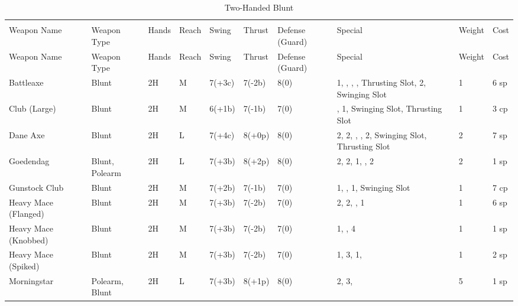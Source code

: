 \documentclass[oneside,11pt,english]{book}
\begin{document}
\begin{longtabu} to 1\linewidth {X[2,l]XX[-1,c]X[-1,c]XXX[-1,c]X[2,l]X[-3,c]X[-3,r]}
	\captionsetup{labelformat=blank,textformat=empty}
	\caption{Two-Handed Blunt}\vspace{-15pt}
	\label{tab:2H Blunt}\\
		Weapon Name						&Weapon Type	&Hands&Reach&Swing&Thrust&Defense (Guard)&Special						&Weight	&Cost\\\toprule\endfirsthead
Weapon Name				&Weapon Type	&Hands	&Reach	&Swing&Thrust&Defense (Guard)&Special																	&Weight	&Cost\\\toprule\endhead
Battleaxe				&Blunt			&2H		&M		&7(+3c)&7(-2b)&8(0)& 1, , , , Thrusting Slot,  2, Swinging Slot	&1 &6 sp\\
Club (Large) 			&Blunt			&2H		&M		&6(+1b)&7(-1b)&7(0)&,  1, Swinging Slot, Thrusting Slot								&1 &3 cp\\
Dane Axe 				&Blunt			&2H		&L		&7(+4c)&8(+0p)&8(0)& 2,  2, , ,  2, Swinging Slot, Thrusting Slot	&2 &7 sp\\
Goedendag 				&Blunt, Polearm	&2H		&L		&7(+3b)&8(+2p)&8(0)& 2,  2,  1, ,  2							&2 &1 sp\\
Gunstock Club 			&Blunt			&2H		&M		&7(+2b)&7(-1b)&7(0)& 1, ,  1, Swinging Slot									&1 &7 cp\\
Heavy Mace (Flanged)	&Blunt			&2H		&M		&7(+3b)&7(-2b)&7(0)& 2,  2, ,  1										&1 &6 sp\\
Heavy Mace (Knobbed)	&Blunt			&2H		&M		&7(+3b)&7(-2b)&7(0)& 1, ,  4													&1 &1 sp\\
Heavy Mace (Spiked) 	&Blunt			&2H		&M		&7(+3b)&7(-2b)&7(0)& 1,  3,  1, 										&1 &2 sp\\
Morningstar 			&Polearm, Blunt	&2H		&L		&7(+3b)&8(+1p)&8(0)& 2,  3, 													&5 &1 sp\\

\end{longtabu}
\end{document}
